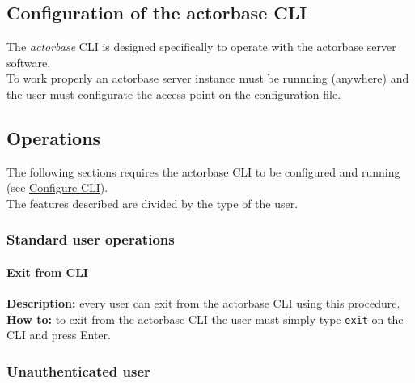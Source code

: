 \documentclass{scalatekids-article}
\begin{document}




\subsection{Configuration of the actorbase CLI}
\label{sec:configurationcli}
The \textit{actorbase} CLI is designed specifically to operate 
with the actorbase server software.\\
To work properly an actorbase server instance must be runnning 
(anywhere) and the user must configurate the access point on the configuration file.

\subsection{Operations}

The following sections requires the actorbase CLI to be configured and 
running (see \hyperref[sec:configurationcli]{Configure CLI}).\\
The features described are divided by the type of the user.

\subsubsection{Standard user operations}
\label{sec:everyuser}
\paragraph{Exit from CLI}

\textbf{Description:} every user can exit from the actorbase CLI 
using this procedure.\\
\textbf{How to:} to exit from the actorbase CLI the user must simply type \texttt{exit} on the CLI and 
press Enter.

\subsubsection{Unauthenticated user}
\label{sec:unauthenticateduser}
\end{document}
